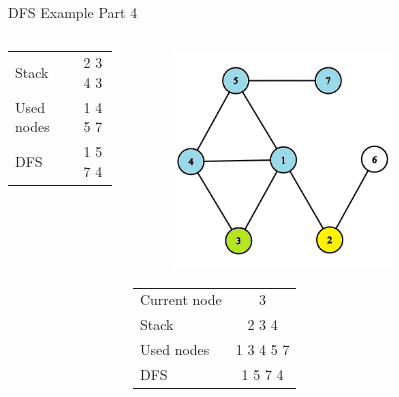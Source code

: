 \documentclass[aspectratio=169]{beamer}%
\begin{document}
\begin{frame}{DFS Example Part 4}
\begin{columns}
\begin{column}{0.32\textwidth}
\begin{table}[ht]
\begin{tabular}{l c}
                    Stack & 2 3 4 3\\ 
                    Used nodes & 1 4 5 7\\
                    DFS & 1 5 7 4
                \end{tabular}
            \end{table}
        \end{column}
        \hfill
        \begin{column}{0.32\textwidth}
            \begin{figure}[!ht]
                \centering
                \includegraphics[width=0.9\linewidth]{dfs 11.png}
            \end{figure}
            \begin{table}[ht]
                \centering
                \begin{tabular}{l c}
                    Current node & 3\\
                    Stack & 2 3 4\\ 
                    Used nodes & 1 3 4 5 7\\
                    DFS & 1 5 7 4
                \end{tabular}
            \end{table}
        \end{column}
        \hfill
        \begin{column}{0.32\textwidth}
            \begin{figure}[!ht]

\end{figure}
\end{column}
\end{columns}
\end{frame}
\end{document}

